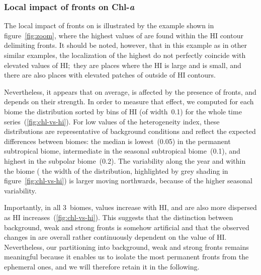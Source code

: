 \subsubsection{Local impact of fronts on Chl-\textit{a}}

The local impact of fronts on  is illustrated by the example shown in figure~\ref{fig:zoom}, where the highest values of  are found within the HI contour delimiting fronts.
It should be noted, however, that in this example as in other similar examples, the localization of the highest  do not perfectly coincide with elevated values of HI;\ they are places where the HI is large and  is small, and there are also places with elevated patches of  outside of HI contours.

Nevertheless, it appears that on average,  is affected by the presence of fronts, and depends on their strength.
In order to measure that effect, we computed for each biome the  distribution sorted by bins of HI (of width~\num{0.1}) for the whole time series~(\cref{fig:chl-vs-hi}).
For low values of the heterogeneity index, these distributions are representative of background conditions and reflect the expected differences between biomes: the median  is lowest~(\qty{0.05}{\mgm}) in the permanent subtropical biome, intermediate in the seasonal subtropical biome~(\qty{0.1}{\mgm}), and highest in the subpolar biome~(\qty{0.2}{\mgm}).
The  variability along the year and within the biome ( the width of the distribution, highlighted by grey shading in figure~\ref{fig:chl-vs-hi}) is larger moving northwards, because of the higher seasonal variability.

Importantly, in all 3~biomes,  values increase with HI, and are also more dispersed as HI increases~(\cref{fig:chl-vs-hi}).
This suggests that the distinction between background, weak and strong fronts is somehow artificial and that the observed changes in  are overall rather continuously dependent on the value of HI\@.
Nevertheless, our partitioning into background, weak and strong fronts remains meaningful because it enables us to isolate the most permanent fronts from the ephemeral ones, and we will therefore retain it in the following.



